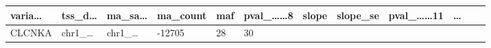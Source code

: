 \documentclass[
]{article}
\begin{document}
\begin{longtable}[]{@{}llllllllllll@{}}
\begin{minipage}[b]{0.06\columnwidth}
varia\ldots{}\strut
\end{minipage} & \begin{minipage}[b]{0.06\columnwidth}\raggedright
tss\_d\ldots{}\strut
\end{minipage} & \begin{minipage}[b]{0.06\columnwidth}\raggedright
ma\_sa\ldots{}\strut
\end{minipage} & \begin{minipage}[b]{0.06\columnwidth}\raggedright
ma\_count\strut
\end{minipage} & \begin{minipage}[b]{0.06\columnwidth}\raggedright
maf\strut
\end{minipage} & \begin{minipage}[b]{0.08\columnwidth}\raggedright
pval\_\ldots\ldots8\strut
\end{minipage} & \begin{minipage}[b]{0.06\columnwidth}\raggedright
slope\strut
\end{minipage} & \begin{minipage}[b]{0.06\columnwidth}\raggedright
slope\_se\strut
\end{minipage} & \begin{minipage}[b]{0.09\columnwidth}\raggedright
pval\_\ldots\ldots11\strut
\end{minipage} & \begin{minipage}[b]{0.02\columnwidth}\raggedright
\ldots{}\strut
\end{minipage}\tabularnewline
\midrule
\endhead
\begin{minipage}[t]{0.06\columnwidth}\raggedright
CLCNKA\strut
\end{minipage} & \begin{minipage}[t]{0.06\columnwidth}\raggedright
chr1\_\ldots{}\strut
\end{minipage} & \begin{minipage}[t]{0.06\columnwidth}\raggedright
chr1\_\ldots{}\strut
\end{minipage} & \begin{minipage}[t]{0.06\columnwidth}\raggedright
-12705\strut
\end{minipage} & \begin{minipage}[t]{0.06\columnwidth}\raggedright
28\strut
\end{minipage} & \begin{minipage}[t]{0.06\columnwidth}\raggedright
30\strut
\end{minipage} & \begin{minipage}[t]{0.06\columnwidth}\raggedright

\end{minipage}
\end{longtable}
\end{document}
